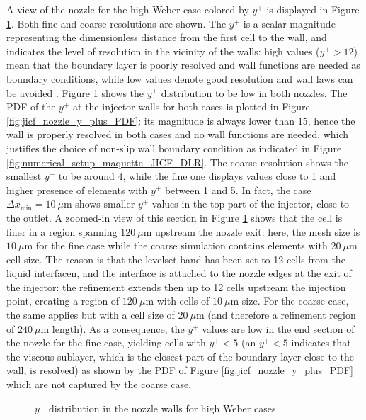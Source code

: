 A view of the nozzle for the high Weber case colored by $y^+$ is displayed in Figure \ref{fig:injector_visualization_y_plus}. Both fine and coarse resolutions are shown. The $y^+$ is a scalar magnitude representing the dimensionless distance from the first cell to the wall, and indicates the level of resolution in the vicinity of the walls: high values ($y^+ > 12$) mean that the boundary layer is poorly resolved and wall functions are needed as boundary conditions, while low values denote good resolution and wall laws can be avoided . Figure \ref{fig:injector_visualization_y_plus} shows the $y^+$ distribution to be low in both nozzles. The PDF of the $y^+$ at the injector walls for both cases is plotted in Figure \ref{fig:jicf_nozzle_y_plus_PDF}: its magnitude is always lower than $15$, hence the wall is properly resolved in both cases and no wall functions are needed, which justifies the choice of non-slip wall boundary condition as indicated in Figure \ref{fig:numerical_setup_maquette_JICF_DLR}.  The coarse resolution shows the smallest $y^+$ to be around 4, while the fine one displays values close to 1 and higher presence of elements with $y^+$ between 1 and 5. In fact, the case $\Delta x_\mathrm{min} = 10 ~\mu$m shows smaller $y^+$ values in the top part of the injector, close to the outlet. A zoomed-in view of this section in Figure \ref{fig:injector_visualization_y_plus} shows that the cell is finer in a region spanning $120~ \mu$m upstream the nozzle exit: here, the mesh size is $10~ \mu$m for the fine case while the coarse simulation contains elements with $20 ~\mu$m cell size. The reason is that the levelset band has been set to 12 cells from the liquid interfacen, and the interface is attached to the nozzle edges at the exit of the injector: the refinement extends then up to 12 cells upstream the injection point, creating a region of $120~\mu$m with cells of $10~\mu$m size. For the coarse case, the same applies but with a cell size of $20~\mu$m (and therefore a refinement region of $240~\mu$m length). As a consequence, the $y^+$ values are low in the end section of the nozzle for the fine case, yielding cells with $y^+ < 5$ (an $y^+ < 5$ indicates that the viscous sublayer, which is the closest part of the boundary layer close to the wall, is resolved) as shown by the PDF of Figure \ref{fig:jicf_nozzle_y_plus_PDF} which are not captured by the coarse case. 


\begin{figure}[ht]
\centering
{}
\caption{$y^+$ distribution in the nozzle walls for high Weber cases}
\label{fig:injector_visualization_y_plus}
\end{figure}

